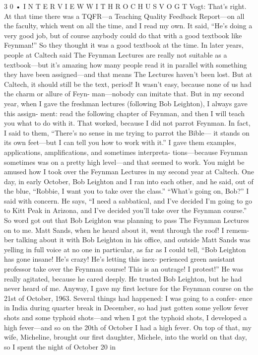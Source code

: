 \documentclass[11pt,oneside]{article}
\begin{document}
3 0 • I N T E R V I E W  W I T H  R O C H U S  V O G T Vogt: That’s right. At that time there was a TQFR---a Teaching Quality Feedback Report---on all the faculty, which went on all the time, and I read my own. It said, “He’s doing a very good job, but of course anybody could do that with a good textbook like Feynman!” So they thought it was a good textbook at the time. In later years, people at Caltech said The Feynman Lectures are really not suitable as a textbook---but it’s amazing how many people read it in parallel with something they have been assigned---and that means The Lectures haven’t been lost. But at Caltech, it should still be the text, period! It wasn’t easy, because none of us had the charm or allure of Feyn- man---nobody can imitate that. But in my second year, when I gave the freshman lectures (following Bob Leighton), I always gave this assign- ment: read the following chapter of Feynman, and then I will teach you what to do with it. That worked, because I did not parrot Feynman. In fact, I said to them, “There’s no sense in me trying to parrot the Bible--- it stands on its own feet---but I can tell you how to work with it.” I gave them examples, applications, amplifications, and sometimes interpreta- tions---because Feynman sometimes was on a pretty high level---and that seemed to work. You might be amused how I took over the Feynman Lectures in my second year at Caltech. One day, in early October, Bob Leighton and I ran into each other, and he said, out of the blue, “Robbie, I want you to take over the class.” “What’s going on, Bob?” I said with concern. He says, “I need a sabbatical, and I’ve decided I’m going to go to Kitt Peak in Arizona, and I’ve decided you’ll take over the Feynman course.” So word got out that Bob Leighton was planning to pass The Feynman Lectures on to me. Matt Sands, when he heard about it, went through the roof! I remem- ber talking about it with Bob Leighton in his office, and outside Matt Sands was yelling in full voice at no one in particular, as far as I could tell, “Bob Leighton has gone insane! He’s crazy! He’s letting this inex- perienced green assistant professor take over the Feynman course! This is an outrage! I protest!” He was really agitated, because he cared deeply. He trusted Bob Leighton, but he had never heard of me. Anyway, I gave my first lecture for the Feynman course on the 21st of October, 1963. Several things had happened: I was going to a confer- ence in India during quarter break in December, so had just gotten some yellow fever shots and some typhoid shots---and when I got the typhoid shots, I developed a high fever---and so on the 20th of October I had a high fever. On top of that, my wife, Micheline, brought our first daughter, Michele, into the world on that day, so I spent the night of October 20 in\par
\end{document}
